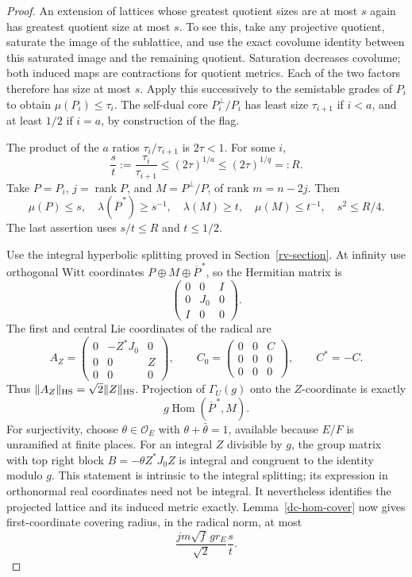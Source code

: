\begin{proof}
An extension of lattices whose greatest quotient sizes
are at most \(s\) again has greatest quotient size at
most \(s\).  To see this, take any projective quotient,
saturate the image of the sublattice, and use the exact
covolume identity between this saturated image and
the remaining quotient.  Saturation decreases
covolume; both induced maps are contractions for
quotient metrics.  Each of the two factors therefore
has size at most \(s\).  Apply this successively to the
semistable grades of \(P_i\) to obtain
\(\mu(P_i)\le\tau_i\).
The self-dual core \(P_i^\perp/P_i\) has least size
\(\tau_{i+1}\) if \(i<a\), and at least \(1/2\)
if \(i=a\), by construction of the flag.

The product of the \(a\) ratios
\(\tau_i/\tau_{i+1}\) is \(2\tau<1\).
For some \(i\),
\[
 \frac{s}{t}:=\frac{\tau_i}{\tau_{i+1}}
       \le(2\tau)^{1/a}\le(2\tau)^{1/q}=:R.
\]
Take \(P=P_i\), \(j=\operatorname{rank}P\), and
\(M=P^\perp/P\), of rank \(m=n-2j\).
Then
\[
 \mu(P)\le s,\quad
 \lambda(\overline P^{\,*})\ge s^{-1},\quad
 \lambda(M)\ge t,\quad \mu(M)\le t^{-1},\quad
                         s^2\le R/4.
\]
The last assertion uses \(s/t\le R\) and \(t\le1/2\).

Use the integral hyperbolic splitting proved in
Section~\ref{rv-section}.  At infinity use orthogonal
Witt coordinates \(P\oplus M\oplus\overline P^{\,*}\),
so the Hermitian matrix is
\[
       \begin{pmatrix}0&0&I\\0&J_0&0\\I&0&0\end{pmatrix}.
\]
The first and central Lie coordinates of the radical are
\[
 A_Z=\begin{pmatrix}0&-Z^*J_0&0\\0&0&Z\\0&0&0\end{pmatrix},
 \qquad
 C_0=\begin{pmatrix}0&0&C\\0&0&0\\0&0&0\end{pmatrix},
 \qquad C^*=-C.
\]
Thus \(\|A_Z\|_{\rm HS}=\sqrt2\|Z\|_{\rm HS}\).
Projection of \(\Gamma_U(g)\) onto the \(Z\)-coordinate
is exactly
\[
               g\operatorname{Hom}(\overline P^{\,*},M).
\]
For surjectivity, choose \(\theta\in\mathcal O_E\)
with \(\theta+\bar\theta=1\), available because
\(E/F\) is unramified at finite places.  For an integral
\(Z\) divisible by \(g\), the group matrix with top
right block \(B=-\theta Z^*J_0Z\) is integral and
congruent to the identity modulo \(g\).
This statement is intrinsic to the integral splitting;
its expression in orthonormal real coordinates need not
be integral.  It nevertheless identifies the projected
lattice and its induced metric exactly.
Lemma~\ref{dc-hom-cover} now gives first-coordinate
covering radius, in the radical norm, at most
\begin{equation}\label{dc-first-radius}
                  \frac{jm\sqrt f\,g r_E}{\sqrt2}\frac{s}{t}.
\end{equation}


\end{proof}
